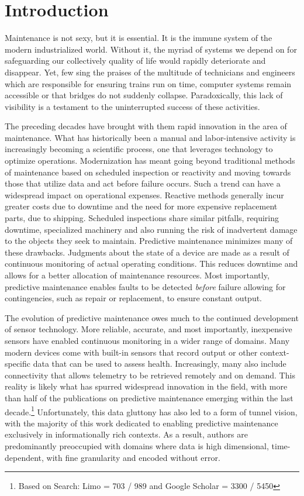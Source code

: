 \chapter*{Introduction}
\thispagestyle{empty}


Maintenance is not sexy, but it is essential. It is the immune system of the modern industrialized world. Without it, the myriad of systems we depend on for safeguarding our collectively quality of life would rapidly deteriorate and disappear. Yet, few sing the praises of the multitude of technicians and engineers which are responsible for ensuring trains run on time, computer systems remain accessible or that bridges do not suddenly collapse. Paradoxically, this lack of visibility is a testament to the uninterrupted success of these activities. 

The preceding decades have brought with them rapid innovation in the area of maintenance. What has historically been a manual and labor-intensive activity is increasingly becoming a scientific process, one that leverages technology to optimize operations. Modernization has meant going beyond traditional methods of maintenance based on scheduled inspection or reactivity and moving towards those that utilize data and act before failure occurs. Such a trend can have a widespread impact on operational expenses. Reactive methods generally incur greater costs due to downtime and the need for more expensive replacement parts, due to shipping. Scheduled inspections share similar pitfalls, requiring downtime, specialized machinery and also running the risk of inadvertent damage to the objects they seek to maintain. Predictive maintenance minimizes many of these drawbacks. Judgments about the state of a device are made as a result of continuous monitoring of actual operating conditions\cite{Mobley2002}. This reduces downtime and allows for a better allocation of maintenance resources. Most importantly, predictive maintenance enables faults to be detected \textit{before} failure allowing for contingencies, such as repair or replacement, to ensure constant output.


The evolution of predictive maintenance owes much to the continued development of sensor technology. More reliable, accurate, and most importantly, inexpensive sensors have enabled continuous monitoring in a wider range of domains. Many modern devices come with built-in sensors that record output or other context-specific data that can be used to assess health. Increasingly, many also include connectivity that allows telemetry to be retrieved remotely and on demand. This reality is likely what has spurred widespread innovation in the field, with more than half of the publications on predictive maintenance emerging within the last decade.\footnote{Based on Search: Limo = 703 / 989 and Google Scholar = 3300 / 5450} Unfortunately, this data gluttony has also led to a form of tunnel vision, with the majority of this work dedicated to enabling predictive maintenance exclusively in informationally rich contexts. As a result, authors are predominantly preoccupied with domains where data is high dimensional, time-dependent, with fine granularity and encoded without error. 


